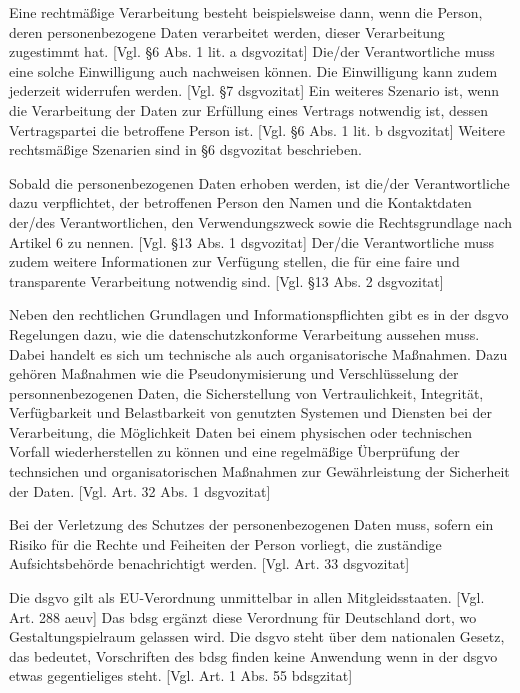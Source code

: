 Eine rechtmäßige Verarbeitung besteht beispielsweise dann, wenn die Person, deren personenbezogene Daten verarbeitet werden, dieser Verarbeitung zugestimmt hat. [Vgl. §6 Abs. 1 lit. a \gls{dsgvozitat}] Die/der Verantwortliche muss eine solche Einwilligung auch nachweisen können. Die Einwilligung kann zudem jederzeit widerrufen werden. [Vgl. §7 \gls{dsgvozitat}] Ein weiteres Szenario ist, wenn die Verarbeitung der Daten zur Erfüllung eines Vertrags notwendig ist, dessen Vertragspartei die betroffene Person ist. [Vgl. §6 Abs. 1 lit. b \gls{dsgvozitat}] Weitere rechtsmäßige Szenarien sind in §6 \gls{dsgvozitat} beschrieben.  

Sobald die personenbezogenen Daten erhoben werden, ist die/der Verantwortliche dazu verpflichtet, der betroffenen Person den Namen und die Kontaktdaten der/des Verantwortlichen, den Verwendungszweck sowie die Rechtsgrundlage nach Artikel 6 zu nennen. [Vgl. §13 Abs. 1 \gls{dsgvozitat}] Der/die Verantwortliche muss zudem weitere Informationen zur Verfügung stellen, die für eine faire und transparente Verarbeitung notwendig sind. [Vgl. §13 Abs. 2 \gls{dsgvozitat}]

Neben den rechtlichen Grundlagen und Informationspflichten gibt es in der \gls{dsgvo} Regelungen dazu, wie die datenschutzkonforme Verarbeitung aussehen muss. Dabei handelt es sich um technische als auch organisatorische Maßnahmen. Dazu gehören Maßnahmen wie die Pseudonymisierung und Verschlüsselung der personnenbezogenen Daten, die Sicherstellung von Vertraulichkeit, Integrität, Verfügbarkeit und Belastbarkeit von genutzten Systemen und Diensten bei der Verarbeitung, die Möglichkeit Daten bei einem physischen oder technischen Vorfall wiederherstellen zu können und eine regelmäßige Überprüfung der technsichen und organisatorischen Maßnahmen zur Gewährleistung der Sicherheit der Daten. [Vgl. Art. 32 Abs. 1 \gls{dsgvozitat}]

Bei der Verletzung des Schutzes der personenbezogenen Daten muss, sofern ein Risiko für die Rechte und Feiheiten der Person vorliegt, die zuständige Aufsichtsbehörde benachrichtigt werden. [Vgl. Art. 33 \gls{dsgvozitat}]

Die \gls{dsgvo} gilt als EU-Verordnung unmittelbar in allen Mitgleidsstaaten. [Vgl. Art. 288 \gls{aeuv}] Das \gls{bdsg} ergänzt diese Verordnung für Deutschland dort, wo Gestaltungspielraum gelassen wird. Die \gls{dsgvo} steht über dem nationalen Gesetz, das bedeutet, Vorschriften des \gls{bdsg} finden keine Anwendung wenn in der \gls{dsgvo} etwas gegentieliges steht. [Vgl. Art. 1 Abs. 55 \gls{bdsgzitat}]

